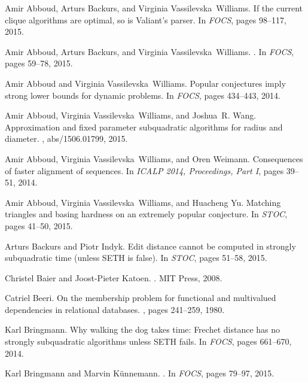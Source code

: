 \documentclass[11pt,letterpaper]{article}
\begin{document}
\begin{thebibliography}{10}

Amir Abboud, Arturs Backurs, and Virginia Vassilevska~Williams.
\newblock If the current clique algorithms are optimal, so is {V}aliant's
  parser.
\newblock In {\em FOCS}, pages 98--117, 2015.

Amir Abboud, Arturs Backurs, and Virginia Vassilevska~Williams.
.
\newblock In {\em FOCS}, pages 59--78, 2015.

Amir Abboud and Virginia Vassilevska~Williams.
\newblock Popular conjectures imply strong lower bounds for dynamic problems.
\newblock In {\em {FOCS}}, pages 434--443, 2014.

Amir Abboud, Virginia Vassilevska~Williams, and Joshua~R. Wang.
\newblock Approximation and fixed parameter subquadratic algorithms for radius
  and diameter.
, abs/1506.01799, 2015.

Amir Abboud, Virginia Vassilevska~Williams, and Oren Weimann.
\newblock Consequences of faster alignment of sequences.
\newblock In {\em {ICALP} 2014, Proceedings, Part {I}}, pages 39--51, 2014.

Amir Abboud, Virginia Vassilevska~Williams, and Huacheng Yu.
\newblock Matching triangles and basing hardness on an extremely popular
  conjecture.
\newblock In {\em {STOC}}, pages 41--50, 2015.

Arturs Backurs and Piotr Indyk.
\newblock Edit distance cannot be computed in strongly subquadratic time
  (unless {SETH} is false).
\newblock In {\em {STOC}}, pages 51--58, 2015.

Christel Baier and Joost-Pieter Katoen.
.
\newblock MIT Press, 2008.

Catriel Beeri.
\newblock On the membership problem for functional and multivalued dependencies
  in relational databases.
, pages 241--259, 1980.

Karl Bringmann.
\newblock Why walking the dog takes time: Frechet distance has no strongly
  subquadratic algorithms unless {SETH} fails.
\newblock In {\em {FOCS}}, pages 661--670, 2014.

Karl Bringmann and Marvin Künnemann.
.
\newblock In {\em FOCS}, pages 79--97, 2015.


\end{thebibliography}
\end{document}
